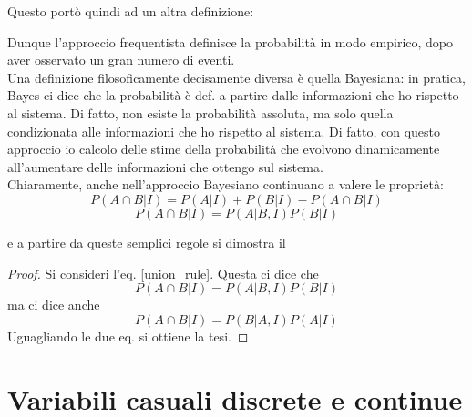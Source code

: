 \documentclass{report}
\begin{document}

Questo portò quindi ad un altra definizione: 

Dunque l'approccio frequentista definisce la probabilità in modo empirico, dopo aver osservato un gran numero di eventi. \\

Una definizione filosoficamente decisamente diversa è quella Bayesiana: in pratica, Bayes ci dice che la probabilità è def. a partire dalle informazioni che ho rispetto al sistema. Di fatto, non esiste la probabilità assoluta, ma solo quella condizionata alle informazioni che ho rispetto al sistema. Di fatto, con questo approccio io calcolo delle stime della probabilità che evolvono dinamicamente all'aumentare delle informazioni che ottengo sul sistema. \\

Chiaramente, anche nell'approccio Bayesiano continuano a valere le proprietà: 
\begin{equation}
    P(A\cap B|I) = P(A|I) + P(B|I) - P(A\cap B|I)
\end{equation}
\begin{equation}
    \label{union_rule}
    P(A\cap B| I) = P(A|B, I)P(B |I)
\end{equation}

e a partire da queste semplici regole si dimostra il

\begin{proof}
    Si consideri l'eq. \ref{union_rule}. Questa ci dice che 
    \begin{equation}
        P(A\cap B| I) = P(A|B, I)P(B |I)
    \end{equation}
    ma ci dice anche 
    \begin{equation}
        P(A\cap B| I) = P(B|A, I)P(A |I)
    \end{equation}
    Uguagliando le due eq. si ottiene la tesi. 
\end{proof}

\section{Variabili casuali discrete e continue}
\end{document}
